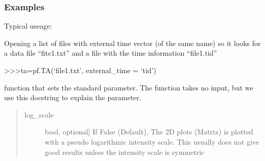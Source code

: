 \documentclass[letterpaper,10pt,english]{sphinxmanual}
\begin{document}
\begin{fulllineitems}
\begin{fulllineitems}
\subsubsection*{Examples}

Typical useage:

\begin{sphinxVerbatim}[commandchars=\\\{\}]
    
 
 
 
\end{sphinxVerbatim}

Opening a list of files with external time vector (of the same name) so it looks for a data
file “fite1.txt” and a file with the time information “file1.tid”

\textgreater{}\textgreater{}\textgreater{}ta=pf.TA(‘file1.txt’, external\_time = ‘tid’)

\end{fulllineitems}


\begin{fulllineitems}
\label{\detokenize{plot_func:plot_func.TA.__make_standard_parameter}}
function that sets the standard parameter. The function takes no input, but we use this docstring to explain the parameter.
\begin{quote}
\begin{description}
\item[{log\_scale}] \leavevmode{[}bool, optional{]}
If False (Default), The 2D plots (Matrix) is plotted with a pseudo logarithmic intensity scale.
This usually does not give good results unless the intensity scale is symmetric


\end{description}
\end{quote}
\end{fulllineitems}
\end{fulllineitems}
\end{document}
